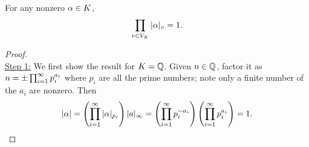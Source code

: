 \begin{thm}
For any nonzero $\alpha\in K$,
\[
\prod_{v\in V_K} |\alpha|_v=1.
\]
\end{thm}
\begin{proof}$\,$\\
%
%
\noindent\underline{Step 1:} We first show the result for $K=\mathbb{Q}$. Given $n\in \mathbb{Q}$, factor it as $n=\pm \prod_{i=1}^{\infty}p_i^{a_i}$ where $p_i$ are all the prime numbers; note only a finite number of the $a_i$ are nonzero. Then 
\[
|\alpha|=\left( {\prod_{i=1}^{\infty} |\alpha|_{p_i}} \right)|a|_{\infty}=\left( {\prod_{i=1}^{\infty} p_i^{-a_i}} \right)\left( {\prod_{i=1}^{\infty} p_i^{a_i}} \right)=1.
\]


\end{proof}
